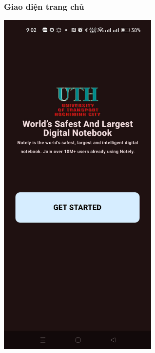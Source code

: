 \documentclass[a4paper,12pt]{article}
\begin{document}
\subsubsection{Giao diện trang chủ}
\includegraphics[width=0.6\textwidth]{GiaoDien.png}
\clearpage
\end{document}

